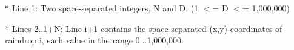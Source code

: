 * Line 1: Two space-separated integers, N and D.  (1 $<$= D $<$=         1,000,000)

* Lines 2..1+N: Line i+1 contains the space-separated (x,y)         coordinates of raindrop i, each value in the range         0...1,000,000.